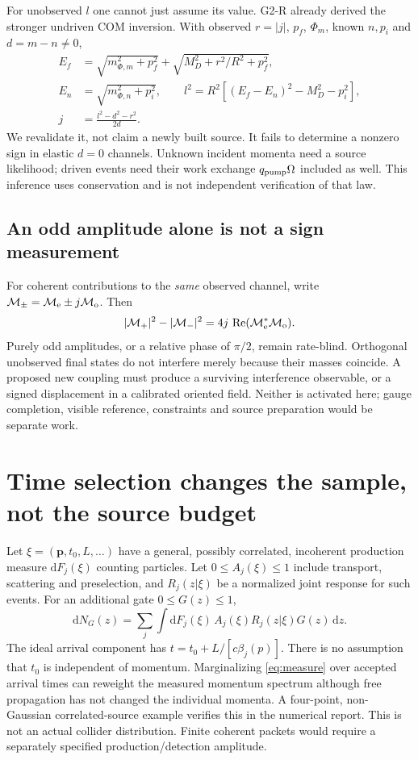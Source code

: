 \documentclass[11pt,a4paper]{article}
\newcommand{\dd}{\mathrm d}
\begin{document}
For unobserved $l$ one cannot just assume its value. G2-R already
derived the stronger undriven COM inversion. With observed
$r=|j|$, $p_f$, $\Phi_m$, known $n,p_i$ and $d=m-n\ne0$,
\begin{align}
 E_f&=\sqrt{m_{\Phi,m}^2+p_f^2}+\sqrt{M_D^2+r^2/R^2+p_f^2},\\
 E_n&=\sqrt{m_{\Phi,n}^2+p_i^2},\qquad
 l^2=R^2[(E_f-E_n)^2-M_D^2-p_i^2],\\
 j&=\frac{l^2-d^2-r^2}{2d}.
\end{align}
We revalidate it, not claim a newly built source. It fails to determine
a nonzero sign in elastic $d=0$ channels. Unknown incident momenta
need a source likelihood; driven events need their work exchange
$q_{\rm pump}\Omega$ included as well. This inference uses conservation
and is not independent verification of that law.

\subsection*{An odd amplitude alone is not a sign measurement}
For coherent contributions to the \emph{same} observed channel, write
$\mathcal M_{\pm}=\mathcal M_{\rm e}\pm j\mathcal M_{\rm o}$. Then
\begin{equation}\label{eq:odd}
 |{\cal M}_{+}|^2-|{\cal M}_{-}|^2
 =4j\,\operatorname{Re}({\cal M}_{\rm e}^*{\cal M}_{\rm o}).
\end{equation}
Purely odd amplitudes, or a relative phase of $\pi/2$, remain rate-blind.
Orthogonal unobserved final states do not interfere merely because
their masses coincide. A proposed new coupling must produce a surviving
interference observable, or a signed displacement in a calibrated
oriented field. Neither is activated here; gauge completion, visible
reference, constraints and source preparation would be separate work.

\newpage
\section{Time selection changes the sample, not the source budget}
Let $\xi=(\mathbf p,t_0,L,\ldots)$ have a general, possibly correlated,
incoherent production measure $\dd F_j(\xi)$ counting particles.
Let $0\leq A_j(\xi)\leq1$ include transport, scattering and preselection,
and $R_j(z|\xi)$ be a normalized joint response for such events.
For an additional gate $0\leq G(z)\leq1$,
\begin{equation}\label{eq:measure}
 \dd N_G(z)=\sum_j\int\dd F_j(\xi)\,
       A_j(\xi)R_j(z|\xi)G(z)\,\dd z .
\end{equation}
The ideal arrival component has $t=t_0+L/[c\beta_j(p)]$.
There is no assumption that $t_0$ is independent of momentum.
Marginalizing \eqref{eq:measure} over accepted arrival times can
reweight the measured momentum spectrum although free propagation
has not changed the individual momenta. A four-point, non-Gaussian
correlated-source example verifies this in the numerical report.
This is not an actual collider distribution. Finite coherent packets
would require a separately specified production/detection amplitude.
\end{document}
